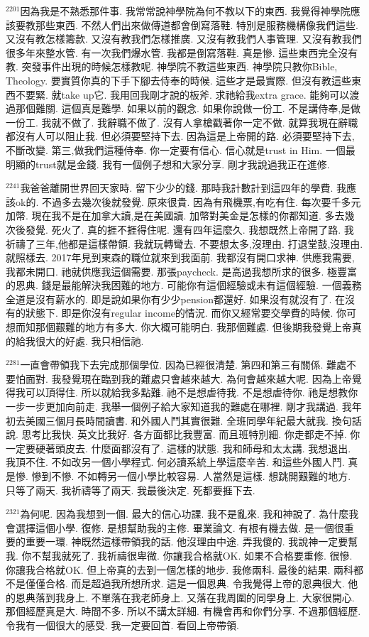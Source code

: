 \documentclass{book}
\begin{document}
$^{2201}$因為我是不熟悉那件事.
我常常說神學院為何不教以下的東西.
我覺得神學院應該要教那些東西.
不然人們出來做傳道都會倒寫落鞋.
特別是服務機構像我們這些.
又沒有教怎樣籌款.
又沒有教我們怎樣推廣.
又沒有教我們人事管理.
又沒有教我們很多年來整水管.
有一次我們爆水管.
我都是倒寫落鞋.
真是慘.
這些東西完全沒有教.
突發事件出現的時候怎樣教呢.
神學院不教這些東西.
神學院只教你Bible, Theology.
要實質你真的下手下腳去侍奉的時候.
這些才是最實際.
但沒有教這些東西不要緊.
就take up它.
我用回我剛才說的板斧.
求祂給我extra grace.
能夠可以渡過那個難關.
這個真是難學.
如果以前的觀念.
如果你說做一份工.
不是講侍奉,是做一份工.
我就不做了.
我辭職不做了.
沒有人拿槍戳著你一定不做.
就算我現在辭職都沒有人可以阻止我.
但必須要堅持下去.
因為這是上帝開的路.
必須要堅持下去,不斷改變.
第三,做我們這種侍奉.
你一定要有信心.
信心就是trust in Him.
一個最明顯的trust就是金錢.
我有一個例子想和大家分享.
剛才我說過我正在進修.

$^{2241}$我爸爸離開世界回天家時.
留下少少的錢.
那時我計數計到這四年的學費.
我應該ok的.
不過多去幾次後就發覺.
原來很貴.
因為有飛機票,有吃有住.
每次要千多元加幣.
現在我不是在加拿大讀,是在美國讀.
加幣對美金是怎樣的你都知道.
多去幾次後發覺.
死火了.
真的捱不捱得住呢.
還有四年這麼久.
我想既然上帝開了路.
我祈禱了三年,他都是這樣帶領.
我就玩轉彎去.
不要想太多,沒理由.
打退堂鼓,沒理由.
就照樣去.
2017年見到東森的職位就來到我面前.
我都沒有開口求神.
供應我需要,我都未開口.
祂就供應我這個需要.
那張paycheck.
是高過我想所求的很多.
極豐富的恩典.
錢是最能解決我困難的地方.
可能你有這個經驗或未有這個經驗.
一個義務全道是沒有薪水的.
即是說如果你有少少pension都還好.
如果沒有就沒有了.
在沒有的狀態下.
即是你沒有regular income的情況.
而你又經常要交學費的時候.
你可想而知那個艱難的地方有多大.
你大概可能明白.
我那個難處.
但後期我發覺上帝真的給我很大的好處.
我只相信祂.

$^{2281}$一直會帶領我下去完成那個學位.
因為已經很清楚.
第四和第三有關係.
難處不要怕面對.
我發覺現在臨到我的難處只會越來越大.
為何會越來越大呢.
因為上帝覺得我可以頂得住.
所以就給我多點難.
祂不是想虐待我.
不是想虐待你.
祂是想教你一步一步更加向前走.
我舉一個例子給大家知道我的難處在哪裡.
剛才我講過.
我年初去美國三個月長時間讀書.
和外國人鬥其實很難.
全班同學年紀最大就我.
換句話說.
思考比我快.
英文比我好.
各方面都比我豐富.
而且班特別細.
你走都走不掉.
你一定要硬著頭皮去.
什麼面都沒有了.
這樣的狀態.
我和師母和太太講.
我想退出.
我頂不住.
不如改另一個小學程式.
何必讀系統上學這麼辛苦.
和這些外國人鬥.
真是慘.
慘到不慘.
不如轉另一個小學比較容易.
人當然是這樣.
想跳開艱難的地方.
只等了兩天.
我祈禱等了兩天.
我最後決定.
死都要捱下去.

$^{2321}$為何呢.
因為我想到一個.
最大的信心功課.
我不是亂來.
我和神說了.
為什麼我會選擇這個小學.
復修.
是想幫助我的主修.
畢業論文.
有根有機去做.
是一個很重要的重要一環.
神既然這樣帶領我的話.
他沒理由中途.
弄我傻的.
我說神一定要幫我.
你不幫我就死了.
我祈禱很卑微.
你讓我合格就OK.
如果不合格要重修.
很慘.
你讓我合格就OK.
但上帝真的去到一個怎樣的地步.
我修兩科.
最後的結果.
兩科都不是僅僅合格.
而是超過我所想所求.
這是一個恩典.
令我覺得上帝的恩典很大.
他的恩典落到我身上.
不單落在我老師身上.
又落在我周圍的同學身上.
大家很開心.
那個經歷真是大.
時間不多.
所以不講太詳細.
有機會再和你們分享.
不過那個經歷.
令我有一個很大的感受.
我一定要回首.
看回上帝帶領.
\end{document}
